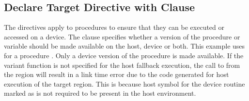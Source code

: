 

\subsection{Declare Target Directive with  Clause}
\label{subsec:declare_target_device_type}




The  directives apply to procedures to ensure that they can be executed or accessed on a device. 
The  clause specifies whether a version of the procedure or variable should be made available on the host, device or both. 
This example uses  for a procedure . Only a device version of the procedure  is made available. 
If the variant function  is not specified for the host fallback execution, the call to  from the  region will result in a link time error due to the code generated for host execution of the target region.
This is because host symbol for the device routine  marked as  is not required to be present in the host environment.


